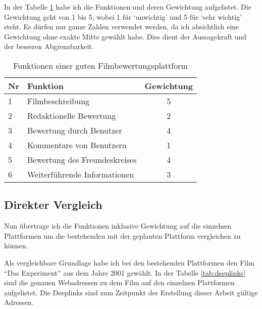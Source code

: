 In der Tabelle \ref{tab:funktionen} habe ich die Funktionen und deren Gewichtung
aufgelistet. Die Gewichtung geht von 1 bis 5, wobei 1 für `unwichtig' und 5 für
`sehr wichtig' steht. Es dürfen nur ganze Zahlen verwendet werden, da ich 
absichtlich eine Gewichtung ohne exakte Mitte gewählt habe. Dies dient der
Aussagekraft und der besseren Abgrenzbarkeit.

\begin{table}[h]
\begin{center}
    \begin{tabular}{llc}
        \toprule Nr & Funktion & Gewichtung \\
        \midrule 1 & Filmbeschreibung & 5 \\
        \midrule 2 & Redaktionelle Bewertung & 2 \\
        \midrule 3 & Bewertung durch Benutzer & 4 \\
        \midrule 4 & Kommentare von Benutzern & 1 \\
        \midrule 5 & Bewertung des Freundeskreises & 4 \\
        \midrule 6 & Weiterführende Informationen & 3 \\
        \bottomrule
    \end{tabular}
    \caption{Funktionen einer guten Filmbewertungsplattform}
    \label{tab:funktionen}
\end{center}
\end{table}

\subsection{Direkter Vergleich}
Nun übertrage ich die Funktionen inklusive Gewichtung auf die einzelnen Plattformen
um die bestehenden mit der geplanten Plattform vergleichen zu können.

Als vergleichbare Grundlage habe ich bei den bestehenden Plattformen den Film 
``Das Experiment'' aus dem Jahre 2001 gewählt. In der Tabelle \ref{tab:deeplinks} 
sind die genauen Webadressen zu dem Film auf den einzelnen Plattformen aufgelistet. 
Die Deeplinks sind zum Zeitpunkt der Erstellung dieser Arbeit gültige Adressen.

